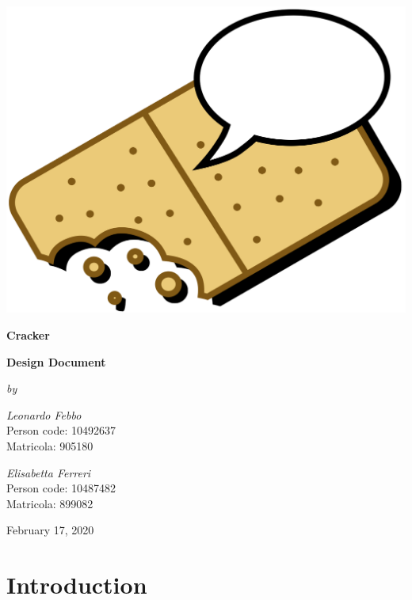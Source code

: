 \begin{titlepage}
\begin{center}
\includegraphics[scale=0.5]{img/logo}
\vspace{8mm}

{\textbf{\Huge{Cracker}}}
\vspace{10mm}

{\textbf{\Large{Design Document}}}
\vspace{25mm}

{\slshape{\Large{by}}} 
\vspace{3mm}

{\slshape{\Large{Leonardo Febbo}}} \\
\vspace{2mm}
{\small{Person code: 10492637\\
Matricola: 905180}}
\vspace{5mm}

{\slshape{\Large{Elisabetta Ferreri}}} \\
\vspace{2mm}
{\small{Person code: 10487482 \\
Matricola: 899082}}

\vfill
{\large{February 17, 2020}}

\end{center}

\end{titlepage}

\setcounter{page}{2}


\newpage
{
	\hypersetup{linkcolor=black}
	\tableofcontents
}
\clearpage
{\section{Introduction}}
\label{sect:introduction}


